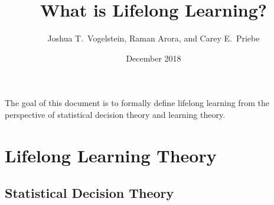 \documentclass{article}
\title{What is Lifelong Learning?}
\author{Joshua T.~Vogelstein, Raman Arora, and Carey E.~Priebe}
\affil{Johns Hopkins University}
\date{December 2018}
\begin{document}
\maketitle

The goal of this document is to formally define lifelong learning from the perspective of statistical decision theory and learning theory.    

\tableofcontents

\clearpage
\setcounter{section}{-1}
\section{Lifelong Learning Theory}
\subsection{Statistical Decision Theory}
\end{document}
